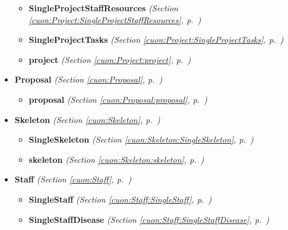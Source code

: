 \begin{itemize}
\begin{itemize}
    \item \textbf{SingleProjectStaffResources}
  \textit{(Section \ref{cuon:Project:SingleProjectStaffResources}, p.~\pageref{cuon:Project:SingleProjectStaffResources})}

    \item \textbf{SingleProjectTasks}
  \textit{(Section \ref{cuon:Project:SingleProjectTasks}, p.~\pageref{cuon:Project:SingleProjectTasks})}

    \item \textbf{project}
  \textit{(Section \ref{cuon:Project:project}, p.~\pageref{cuon:Project:project})}

  \end{itemize}
\item \textbf{Proposal}
  \textit{(Section \ref{cuon:Proposal}, p.~\pageref{cuon:Proposal})}

  \begin{itemize}
\setlength{\parskip}{0ex}
    \item \textbf{proposal}
  \textit{(Section \ref{cuon:Proposal:proposal}, p.~\pageref{cuon:Proposal:proposal})}

  \end{itemize}
\item \textbf{Skeleton}
  \textit{(Section \ref{cuon:Skeleton}, p.~\pageref{cuon:Skeleton})}

  \begin{itemize}
\setlength{\parskip}{0ex}
    \item \textbf{SingleSkeleton}
  \textit{(Section \ref{cuon:Skeleton:SingleSkeleton}, p.~\pageref{cuon:Skeleton:SingleSkeleton})}

    \item \textbf{skeleton}
  \textit{(Section \ref{cuon:Skeleton:skeleton}, p.~\pageref{cuon:Skeleton:skeleton})}

  \end{itemize}
\item \textbf{Staff}
  \textit{(Section \ref{cuon:Staff}, p.~\pageref{cuon:Staff})}

  \begin{itemize}
\setlength{\parskip}{0ex}
    \item \textbf{SingleStaff}
  \textit{(Section \ref{cuon:Staff:SingleStaff}, p.~\pageref{cuon:Staff:SingleStaff})}

    \item \textbf{SingleStaffDisease}
  \textit{(Section \ref{cuon:Staff:SingleStaffDisease}, p.~\pageref{cuon:Staff:SingleStaffDisease})}


\end{itemize}
\end{itemize}
